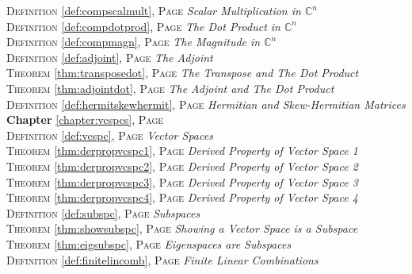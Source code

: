 \begin{multicols}{2}
{\textsc{Definition} \ref{def:compscalmult}, \textsc{Page} \pageref{def:compscalmult} \textit{Scalar Multiplication in \(\mathbb {C}^n\)} \\
\textsc{Definition} \ref{def:compdotprod}, \textsc{Page} \pageref{def:compdotprod} \textit{The Dot Product in \(\mathbb {C}^n\)} \\
\textsc{Definition} \ref{def:compmagn}, \textsc{Page} \pageref{def:compmagn} \textit{The Magnitude in \(\mathbb {C}^n\)} \\
\textsc{Definition} \ref{def:adjoint}, \textsc{Page} \pageref{def:adjoint} \textit{The Adjoint} \\
\textsc{Theorem} \ref{thm:transposedot}, \textsc{Page} \pageref{thm:transposedot} \textit{The Transpose and The Dot Product} \\
\textsc{Theorem} \ref{thm:adjointdot}, \textsc{Page} \pageref{thm:adjointdot} \textit{The Adjoint and The Dot Product} \\
\textsc{Definition} \ref{def:hermitskewhermit}, \textsc{Page} \pageref{def:hermitskewhermit} \textit{Hermitian and Skew-Hermitian Matrices} \\
\textbf{Chapter} \ref{chapter:vcspcs}, \textsc{Page} \pageref{chapter:vcspcs} \\
\textsc{Definition} \ref{def:vcspc}, \textsc{Page} \pageref{def:vcspc} \textit{Vector Spaces} \\
\textsc{Theorem} \ref{thm:derpropvcspc1}, \textsc{Page} \pageref{thm:derpropvcspc1} \textit{Derived Property of Vector Space 1} \\
\textsc{Theorem} \ref{thm:derpropvcspc2}, \textsc{Page} \pageref{thm:derpropvcspc2} \textit{Derived Property of Vector Space 2} \\
\textsc{Theorem} \ref{thm:derpropvcspc3}, \textsc{Page} \pageref{thm:derpropvcspc3} \textit{Derived Property of Vector Space 3} \\
\textsc{Theorem} \ref{thm:derpropvcspc4}, \textsc{Page} \pageref{thm:derpropvcspc4} \textit{Derived Property of Vector Space 4} \\
\textsc{Definition} \ref{def:subspc}, \textsc{Page} \pageref{def:subspc} \textit{Subspaces} \\
\textsc{Theorem} \ref{thm:showsubspc}, \textsc{Page} \pageref{thm:showsubspc} \textit{Showing a Vector Space is a Subspace} \\
\textsc{Theorem} \ref{thm:eigsubspc}, \textsc{Page} \pageref{thm:eigsubspc} \textit{Eigenspaces are Subspaces} \\
\textsc{Definition} \ref{def:finitelincomb}, \textsc{Page} \pageref{def:finitelincomb} \textit{Finite Linear Combinations} \\
}
\end{multicols}

